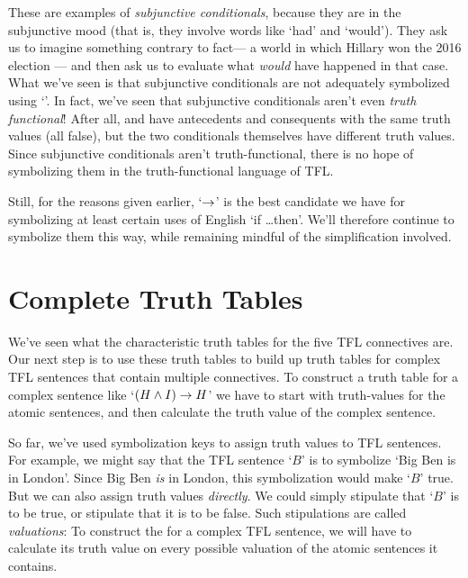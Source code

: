 These are examples of  \emph{subjunctive conditionals}, because they are in the subjunctive mood (that is, they involve words like `had' and `would').  They ask us to imagine something contrary to fact--- a world in which Hillary won the 2016 election --- and then ask us to evaluate what \emph{would} have happened in that case. What we've seen is that subjunctive conditionals are not adequately symbolized using `\eif'. In fact, we've seen that subjunctive conditionals aren't even \emph{truth functional}!  After all,  and  have antecedents and consequents with the same truth values (all false), but the two conditionals themselves have different truth values. Since subjunctive conditionals aren't truth-functional, there is no hope of symbolizing them in the truth-functional language of TFL.

Still, for the reasons given earlier, `$\rightarrow$' is the best candidate we have for symbolizing at least certain uses of English `if \ldots then'.  We'll therefore continue to symbolize them this way, while remaining mindful of the simplification involved.

\section{Complete Truth Tables}\label{s:CompleteTruthTables}

We've seen what the characteristic truth tables for the five TFL connectives are.  Our next step is to use these truth tables to build up truth tables for complex TFL sentences that contain multiple connectives.  To construct a truth table for a complex sentence like `$(H \wedge I) \rightarrow H$' we have to start with truth-values for the atomic sentences, and then calculate the truth value of the complex sentence.

So far, we've used symbolization keys to assign truth values to TFL sentences. For example, we might say that the TFL sentence `$B$' is to symbolize `Big Ben is in London'.  Since Big Ben \emph{is} in London, this symbolization would make `$B$' true. But we can also assign truth values \emph{directly}. We could simply stipulate that `$B$' is to be true, or stipulate that it is to be false. Such stipulations are called \emph{valuations}:
To construct the  for a complex TFL sentence, we will have to calculate its truth value on every possible valuation of the atomic sentences it contains.

